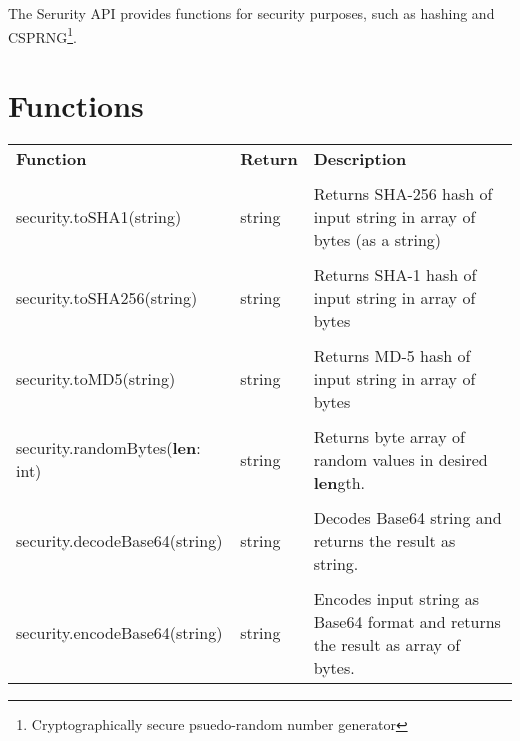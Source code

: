 The Serurity API provides functions for security purposes, such as hashing and CSPRNG\footnote{Cryptographically secure psuedo-random number generator}.

\section{Functions}

\begin{tabularx}{\textwidth}{l l X}
	\textbf{\large Function} & \textbf{\large Return} & \textbf{\large Description}
	\\ \\
	\endhead
	security.toSHA1(string) & string & Returns SHA-256 hash of input string in array of bytes (as a string)
	\\ \\
	security.toSHA256(string) & string & Returns SHA-1 hash of input string in array of bytes
		\\ \\
	security.toMD5(string) & string & Returns MD-5 hash of input string in array of bytes
	\\ \\
	security.randomBytes(\textbf{len}: int) & string & Returns byte array of random values in desired \textbf{len}gth.
	\\ \\
	security.decodeBase64(string) & string & Decodes Base64 string and returns the result as string.
	\\ \\
	security.encodeBase64(string) & string & Encodes input string as Base64 format and returns the result as array of bytes.
\end{tabularx}